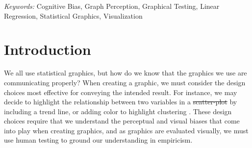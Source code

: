\documentclass[12pt]{article}
\providecommand{\DIFaddtex}[1]{{\protect\color{blue}\uwave{#1}}} %
\providecommand{\DIFdeltex}[1]{{\protect\color{red}\sout{#1}}}                      %
\providecommand{\DIFaddbegin}{} %
\providecommand{\DIFaddend}{} %
\providecommand{\DIFdelbegin}{} %
\providecommand{\DIFdelend}{} %
\providecommand{\DIFadd}[1]{\texorpdfstring{\DIFaddtex{#1}}{#1}} %
\providecommand{\DIFdel}[1]{\texorpdfstring{\DIFdeltex{#1}}{}} %
\newcommand{\DIFscaledelfig}{0.5}
\newlength{\DIFdelgraphicswidth} %
\newlength{\DIFdelgraphicsheight} %
\newcommand{\DIFaddincludegraphics}[2][]{{\color{blue}\fbox{\DIFOincludegraphics[#1]{#2}}}} %
\newcommand{\DIFdelincludegraphics}[2][]{%
\sbox{\DIFdelgraphicsbox}{\DIFOincludegraphics[#1]{#2}}%
\settoboxwidth{\DIFdelgraphicswidth}{\DIFdelgraphicsbox} %
\settoboxtotalheight{\DIFdelgraphicsheight}{\DIFdelgraphicsbox} %
\scalebox{\DIFscaledelfig}{%
\parbox[b]{\DIFdelgraphicswidth}{\usebox{\DIFdelgraphicsbox}\\[-\baselineskip] \rule{\DIFdelgraphicswidth}{0em}}\llap{\resizebox{\DIFdelgraphicswidth}{\DIFdelgraphicsheight}{%
\setlength{\unitlength}{\DIFdelgraphicswidth}%
\begin{picture}(1,1)%
\thicklines\linethickness{2pt} %
{\color[rgb]{1,0,0}\put(0,0){\framebox(1,1){}}}%
{\color[rgb]{1,0,0}\put(0,0){\line( 1,1){1}}}%
{\color[rgb]{1,0,0}\put(0,1){\line(1,-1){1}}}%
\end{picture}%
}\hspace*{3pt}}} %
} %
\DeclareRobustCommand{\DIFaddbegin}{\DIFOaddbegin \let\includegraphics\DIFaddincludegraphics} %
\DeclareRobustCommand{\DIFaddend}{\DIFOaddend \let\includegraphics\DIFOincludegraphics} %
\DeclareRobustCommand{\DIFdelbegin}{\DIFOdelbegin \let\includegraphics\DIFdelincludegraphics} %
\DeclareRobustCommand{\DIFdelend}{\DIFOaddend \let\includegraphics\DIFOincludegraphics} %
\begin{document}
\noindent%
{\it Keywords:} Cognitive Bias, Graph Perception, Graphical
Testing, Linear Regression, Statistical Graphics, Visualization
\vfill

\newpage
{} %

\hypertarget{introduction}{%
\section{Introduction}\label{introduction}}

We all use statistical graphics, but how do we know that the graphics we
use are communicating properly? When creating a graphic, we must
consider the design choices most effective for conveying the intended
result. For instance, we may decide to highlight the relationship
between two variables in a \DIFdelbegin \DIFdel{scatter-plot }\DIFdelend \DIFaddbegin \DIFadd{scatterplot }\DIFaddend by including a trend line, or
adding color to highlight clustering \citep{vanderplas2017clusters}.
These design choices require that we understand the perceptual and
visual biases that come into play when creating graphics, and as
graphics are evaluated visually, we must use human testing to ground our
understanding in empiricism.
\end{document}
